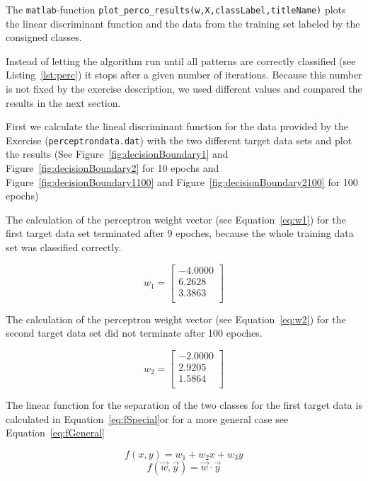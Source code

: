 \documentclass[subfigure,epsfig,fleqn,float,ausarbeitung]{scrartcl}
\begin{document}
The \texttt{matlab}-function \texttt{plot\_perco\_results(w,X,classLabel,titleName)} plots the linear discriminant function and the data from the training set labeled by the consigned classes.

Instead of letting the algorithm run until all patterns are correctly classified (see Listing~\ref{lst:perc}) it stops after a given number of iterations. Because this number is not fixed by the exercise description, we used different values and compared the results in the next section.

First we calculate the lineal discriminant function for the data provided by the Exercise (\texttt{perceptrondata.dat}) with the two different target data sets and plot the results (See Figure~\ref{fig:decisionBoundary1} and Figure~\ref{fig:decisionBoundary2} for 10 epochs and Figure~\ref{fig:decisionBoundary1100} and Figure~\ref{fig:decisionBoundary2100} for 100 epochs)

The calculation of the perceptron weight vector (see Equation~\ref{eq:w1}) for the first target data set terminated after 9 epoches, because the whole training data set was classified correctly.

\begin{equation}
w_1 = 
	\begin{bmatrix}
      -4.0000\\
			6.2628\\
			3.3863\\
	\end{bmatrix}
	\label{eq:w1}
\end{equation}

The calculation of the perceptron weight vector (see Equation~\ref{eq:w2}) for the second target data set did not terminate after 100 epoches.

\begin{equation}
w_2 = 
	\begin{bmatrix}
      -2.0000\\
			2.9205\\
			1.5864\\
	\end{bmatrix}
	\label{eq:w2}
\end{equation}

The linear function for the separation of the two classes for the first target data is calculated in Equation~\ref{eq:fSpecial}or for a more general case see Equation~\ref{eq:fGeneral}

\begin{equation}
	f(x,y) = w_1 +w_2 x+w_3 y 
	\label{eq:fSpecial}
\end{equation}
\begin{equation}
	f(\vec{w},\vec{y}) = \vec{w} \cdot \vec{y}
	\label{eq:fGeneral}
\end{equation}
\end{document}
